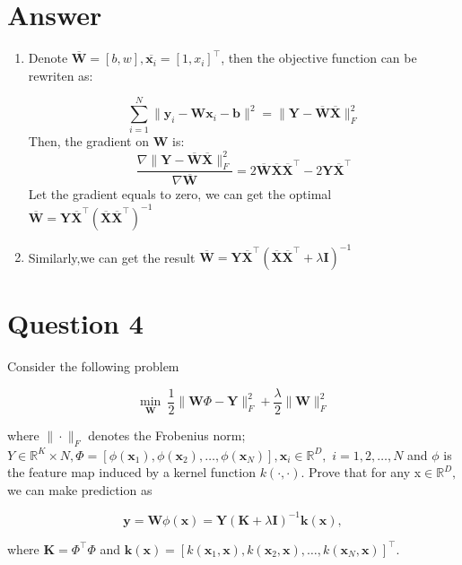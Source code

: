 \documentclass[
	12pt, %
]{fphw}
\begin{document}
\section*{Answer}
\begin{enumerate}
	\item Denote $\overline{\mathbf{W}} = [b , w], \overline{\mathbf{x} _i} = [1 , x_i ]^\top$, then the objective function can be rewriten as:

\begin{equation*}
    \sum _{i= 1}^N\|\mathbf{y} _i- \mathbf{W} \mathbf{x} _i- \mathbf{b} \|^2 = \|\mathbf{Y} - \overline{\mathbf{W}}  \overline{\mathbf{X}} \|^2_F
\end{equation*}
Then, the gradient on $\mathbf{W}$ is:
\begin{equation*}
    \frac{\nabla\|\mathbf{Y} - \overline{\mathbf{W}}  \overline{\mathbf{X}} \|^2_F}{\nabla\overline{\mathbf{W}}}=2\overline{\mathbf{W}}\overline{\mathbf{X}} \overline{\mathbf{X}}^{\top}  - 2\mathbf{Y}\overline{\mathbf{X}}^{\top}
\end{equation*}
Let the gradient equals to zero, we can get the optimal $\overline{\mathbf{W}} = \mathbf{Y}\overline{\mathbf{X}}^{\top}\left(\overline{\mathbf{X}}\overline{\mathbf{X}}^{\top} \right)^{-1} $

\item Similarly,we can get the result $\overline{\mathbf{W}} = \mathbf{Y}\overline{\mathbf{X}}^{\top}\left(\overline{\mathbf{X}}\overline{\mathbf{X}}^{\top} +\lambda\mathbf{I} \right)^{-1}$
\end{enumerate}

\section*{Question 4}

\begin{problem}
 Consider the following problem

$$
\underset{\mathbf{W}}{\min}\:\frac12\|\mathbf{W}\Phi-\mathbf{Y}\|_{F}^{2}+\frac\lambda2\|\mathbf{W}\|_{F}^{2}
$$

where $\|\cdot \|_F$ denotes the Frobenius norm; $Y \in \mathbb{R} ^K\times N, \Phi= [ \phi( \mathbf{x} _1) , \phi( \mathbf{x} _2) , \ldots , \phi( \mathbf{x} _N) ] , \mathbf{x} _i\in \mathbb{R} ^D, $ $i=1,2,\ldots,N$ and $\phi$ is the feature map induced by a kernel function $k(\cdot,\cdot)$. Prove that for any x$\in \mathbb{R} ^D, $ we can make prediction as

$$
\mathbf{y}=\mathbf{W}\phi(\mathbf{x})=\mathbf{Y}\left(\mathbf{K}+\lambda\mathbf{I}\right)^{-1}\mathbf{k}(\mathbf{x}),
$$

where $\mathbf{K} = \Phi^\top\Phi$ and $\mathbf{k}(\mathbf{x}) = [k(\mathbf{x}_1, \mathbf{x}), k(\mathbf{x}_2, \mathbf{x}), \ldots, k(\mathbf{x}_N, \mathbf{x})]^\top$.
\end{problem}
\end{document}
